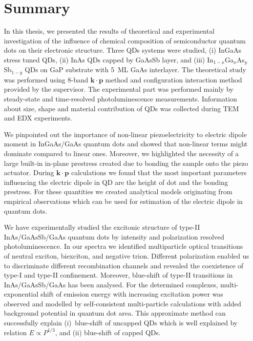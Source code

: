 
\chapter{Summary}\label{chap:summary}

In this thesis, we presented the results of theoretical and experimental investigation of the influence of chemical composition of semiconductor quantum dots on their electronic structure. Three QDs systems were studied, (i) InGaAs stress tuned QDs, (ii) InAs QDs capped by GaAsSb layer, and (iii) In$_{1-x}$Ga$_x$As$_y$Sb$_{1-y}$ QDs on GaP substrate with 5~ML GaAs interlayer. The theoretical study was performed using 8-band $\mathbf{k\cdot p}$ method and configuration interaction method provided by the supervisor. The experimental part was performed mainly by steady-state and time-resolved photoluminescence measurements. Information about size, shape and material contribution of QDs was collected during TEM and EDX experiments.

We pinpointed out the importance of non-linear piezoelectricity to electric dipole moment in InGaAs/GaAs quantum dots and showed that non-linear terms might dominate compared to linear ones. Moreover, we highlighted the necessity of a large built-in in-plane prestress created due to bonding the sample onto the piezo actuator. During $\mathbf{k\cdot p}$ calculations we found that the most important parameters influencing the electric dipole in QD are the height of dot and the bonding prestress. For these quantities we created analytical models originating from empirical observations which can be used for estimation of the electric dipole in quantum dots.

We have experimentally studied the excitonic structure of type-II InAs/GaAsSb/GaAs quantum dots by intensity and polarization resolved photoluminescence. In our spectra we identified multiparticle optical transitions of neutral exciton, biexciton, and negative trion. Different polarization enabled us to discriminate different recombination channels and revealed the coexistence of type-I and type-II confinement.
%
Moreover, blue-shift of type-II transitions in InAs/GaAsSb/GaAs has been analysed. For the determined complexes, multi-exponential shift of emission energy with increasing excitation power was observed and modelled by self-consistent multi-particle calculations with added background potential in quantum dot area. This approximate method can successfully explain (i)~blue-shift of uncapped QDs which is well explained by relation $E\propto P^{1/3}$, and (ii) blue-shift of capped QDs.


